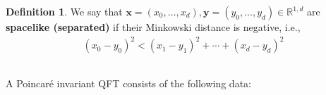 \documentclass[12pt,b5paper,notitlepage]{article}
\theoremstyle{definition}
\newtheorem{df}{Definition}[section]
\theoremstyle{plain}
\newcommand{\Rbb}{\mathbb R}
\newcommand{\xbf}{\mathbf x}
\newcommand{\ybf}{\mathbf y}
\numberwithin{equation}{section}
\begin{document}
\begin{df}
We say that $\xbf=(x_0,\dots,x_d),\ybf=(y_0,\dots,y_d)\in\Rbb^{1,d}$ are \textbf{spacelike (separated)}  if their Minkowski distance is negative, i.e.,
\begin{align*}
(x_0-y_0)^2<(x_1-y_1)^2+\cdots+(x_d-y_d)^2
\end{align*}
\end{df}




\subsection{}\label{lb1}






A Poincar\'e invariant QFT consists of the following data:
\end{document}
